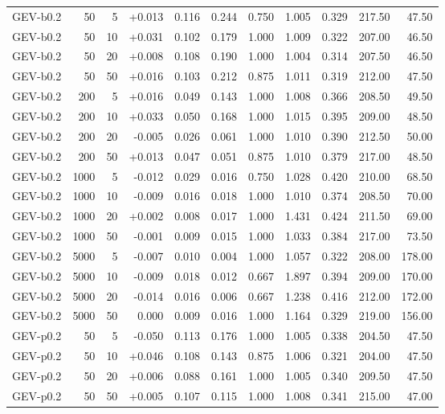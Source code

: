 \begin{table}[t]
\begin{tabular}{lrrrrrrrrrr}
GEV-b0.2 &   50 &    5 & +0.013 & 0.116 & 0.244 & 0.750 & 1.005 & 0.329 & 217.50 & 47.50 \\
GEV-b0.2 &   50 &   10 & +0.031 & 0.102 & 0.179 & 1.000 & 1.009 & 0.322 & 207.00 & 46.50 \\
GEV-b0.2 &   50 &   20 & +0.008 & 0.108 & 0.190 & 1.000 & 1.004 & 0.314 & 207.50 & 46.50 \\
GEV-b0.2 &   50 &   50 & +0.016 & 0.103 & 0.212 & 0.875 & 1.011 & 0.319 & 212.00 & 47.50 \\
GEV-b0.2 &  200 &    5 & +0.016 & 0.049 & 0.143 & 1.000 & 1.008 & 0.366 & 208.50 & 49.50 \\
GEV-b0.2 &  200 &   10 & +0.033 & 0.050 & 0.168 & 1.000 & 1.015 & 0.395 & 209.00 & 48.50 \\
GEV-b0.2 &  200 &   20 & -0.005 & 0.026 & 0.061 & 1.000 & 1.010 & 0.390 & 212.50 & 50.00 \\
GEV-b0.2 &  200 &   50 & +0.013 & 0.047 & 0.051 & 0.875 & 1.010 & 0.379 & 217.00 & 48.50 \\
GEV-b0.2 & 1000 &    5 & -0.012 & 0.029 & 0.016 & 0.750 & 1.028 & 0.420 & 210.00 & 68.50 \\
GEV-b0.2 & 1000 &   10 & -0.009 & 0.016 & 0.018 & 1.000 & 1.010 & 0.374 & 208.50 & 70.00 \\
GEV-b0.2 & 1000 &   20 & +0.002 & 0.008 & 0.017 & 1.000 & 1.431 & 0.424 & 211.50 & 69.00 \\
GEV-b0.2 & 1000 &   50 & -0.001 & 0.009 & 0.015 & 1.000 & 1.033 & 0.384 & 217.00 & 73.50 \\
GEV-b0.2 & 5000 &    5 & -0.007 & 0.010 & 0.004 & 1.000 & 1.057 & 0.322 & 208.00 & 178.00 \\
GEV-b0.2 & 5000 &   10 & -0.009 & 0.018 & 0.012 & 0.667 & 1.897 & 0.394 & 209.00 & 170.00 \\
GEV-b0.2 & 5000 &   20 & -0.014 & 0.016 & 0.006 & 0.667 & 1.238 & 0.416 & 212.00 & 172.00 \\
GEV-b0.2 & 5000 &   50 & 0.000 & 0.009 & 0.016 & 1.000 & 1.164 & 0.329 & 219.00 & 156.00 \\
GEV-p0.2 &   50 &    5 & -0.050 & 0.113 & 0.176 & 1.000 & 1.005 & 0.338 & 204.50 & 47.50 \\
GEV-p0.2 &   50 &   10 & +0.046 & 0.108 & 0.143 & 0.875 & 1.006 & 0.321 & 204.00 & 47.50 \\
GEV-p0.2 &   50 &   20 & +0.006 & 0.088 & 0.161 & 1.000 & 1.005 & 0.340 & 209.50 & 47.50 \\
GEV-p0.2 &   50 &   50 & +0.005 & 0.107 & 0.115 & 1.000 & 1.008 & 0.341 & 215.00 & 47.00 \\

\end{tabular}
\end{table}
